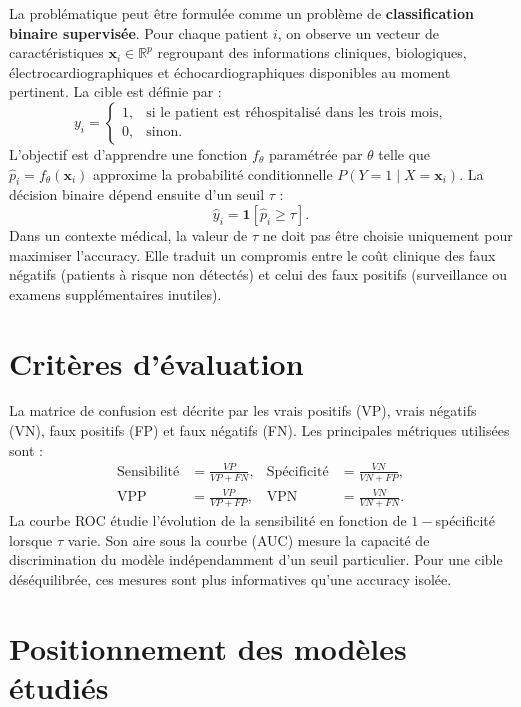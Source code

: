 \documentclass[12pt,a4paper]{report}
\begin{document}
La problématique peut être formulée comme un problème de \textbf{classification binaire
supervisée}. Pour chaque patient $i$, on observe un vecteur de caractéristiques
$\mathbf{x}_i\in\mathbb{R}^{p}$ regroupant des informations cliniques, biologiques,
électrocardiographiques et échocardiographiques disponibles au moment pertinent. La cible
est définie par :
\begin{equation}
 y_i =
 \begin{cases}
 1, & \text{si le patient est réhospitalisé dans les trois mois,}\\
 0, & \text{sinon.}
 \end{cases}
\end{equation}
L'objectif est d'apprendre une fonction $f_\theta$ paramétrée par $\theta$ telle que
$\hat p_i=f_\theta(\mathbf{x}_i)$ approxime la probabilité conditionnelle
$P(Y=1\mid X=\mathbf{x}_i)$. La décision binaire dépend ensuite d'un seuil $\tau$ :
\begin{equation}
 \hat y_i=\mathbf{1}[\hat p_i\geq \tau].
\end{equation}
Dans un contexte médical, la valeur de $\tau$ ne doit pas être choisie uniquement pour
maximiser l'accuracy. Elle traduit un compromis entre le coût clinique des faux négatifs
(patients à risque non détectés) et celui des faux positifs (surveillance ou examens
supplémentaires inutiles).

\section{Critères d'évaluation}

La matrice de confusion est décrite par les vrais positifs (VP), vrais négatifs (VN), faux
positifs (FP) et faux négatifs (FN). Les principales métriques utilisées sont :
\begin{align}
 \text{Sensibilité} &= \frac{VP}{VP+FN}, &
 \text{Spécificité} &= \frac{VN}{VN+FP},\\
 \text{VPP} &= \frac{VP}{VP+FP}, &
 \text{VPN} &= \frac{VN}{VN+FN}.
\end{align}
La courbe ROC étudie l'évolution de la sensibilité en fonction de $1-$spécificité lorsque
$\tau$ varie. Son aire sous la courbe (AUC) mesure la capacité de discrimination du modèle
indépendamment d'un seuil particulier. Pour une cible déséquilibrée, ces mesures sont plus
informatives qu'une accuracy isolée.

\section{Positionnement des modèles étudiés}
\end{document}
